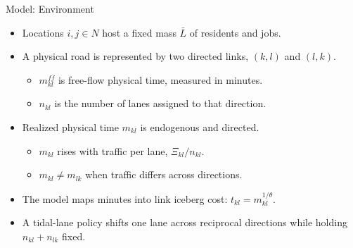 \documentclass[11pt,aspectratio=169]{beamer}
\begin{document}
\begin{frame}{Model: Environment}
\begin{itemize}\small
  \item Locations $i,j\in N$ host a fixed mass $\bar L$ of residents and jobs.
  \item A physical road is represented by two directed links, $(k,l)$ and $(l,k)$.
  \begin{itemize}\footnotesize
    \item $m_{kl}^{ff}$ is free-flow physical time, measured in minutes.
    \item $n_{kl}$ is the number of lanes assigned to that direction.
  \end{itemize}
  \item Realized physical time $m_{kl}$ is endogenous and directed.
  \begin{itemize}\footnotesize
    \item $m_{kl}$ rises with traffic per lane, $\Xi_{kl}/n_{kl}$.
    \item $m_{kl}\neq m_{lk}$ when traffic differs across directions.
  \end{itemize}
  \item The model maps minutes into link iceberg cost: $t_{kl}=m_{kl}^{1/\theta}$.
  \item A tidal-lane policy shifts one lane across reciprocal directions while holding $n_{kl}+n_{lk}$ fixed.
\end{itemize}
\end{frame}
\end{document}
